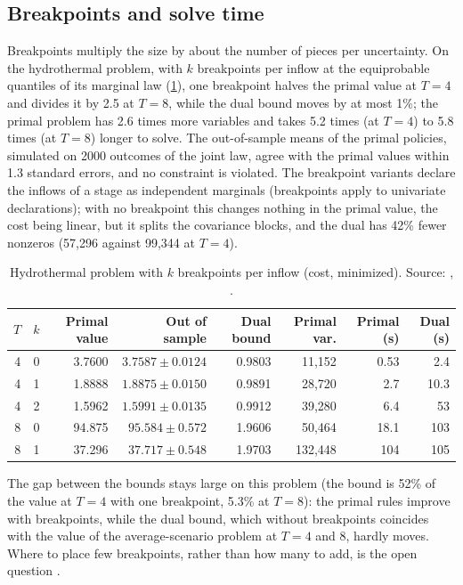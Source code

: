 \subsection{Breakpoints and solve time}

Breakpoints multiply the size by about the number of pieces per uncertainty.
On the hydrothermal problem, with $k$ breakpoints per inflow at the equiprobable quantiles of its marginal law (\cref{tab:breakpoints}),
one breakpoint halves the primal value at $T = 4$ and divides it by 2.5 at $T = 8$,
while the dual bound moves by at most 1\%;
the primal problem has 2.6 times more variables and takes 5.2 times (at $T = 4$) to 5.8 times (at $T = 8$) longer to solve.
The out-of-sample means of the primal policies, simulated on 2000 outcomes of the joint law, agree with the primal values within 1.3 standard errors, and no constraint is violated.
The breakpoint variants declare the inflows of a stage as independent marginals (breakpoints apply to univariate declarations);
with no breakpoint this changes nothing in the primal value, the cost being linear, but it splits the covariance blocks, and the dual has 42\% fewer nonzeros (57,296 against 99,344 at $T = 4$).

\begin{table}[ht]
\centering
\caption[Hydrothermal problem with breakpoints]{Hydrothermal problem with $k$ breakpoints per inflow (cost, minimized).
Source: , .}
\label{tab:breakpoints}
\small
\setlength{\tabcolsep}{4pt}
\begin{tabular}{rrrrrrrr}
\toprule
$T$ & $k$ & Primal value & Out of sample & Dual bound & Primal var. & Primal (s) & Dual (s) \\
\midrule
4 & 0 & 3.7600 & $3.7587 \pm 0.0124$ & 0.9803 & 11,152 & 0.53 & 2.4 \\
4 & 1 & 1.8888 & $1.8875 \pm 0.0150$ & 0.9891 & 28,720 & 2.7 & 10.3 \\
4 & 2 & 1.5962 & $1.5991 \pm 0.0135$ & 0.9912 & 39,280 & 6.4 & 53 \\
8 & 0 & 94.875 & $95.584 \pm 0.572$ & 1.9606 & 50,464 & 18.1 & 103 \\
8 & 1 & 37.296 & $37.717 \pm 0.548$ & 1.9703 & 132,448 & 104 & 105 \\
\bottomrule
\end{tabular}
\end{table}

The gap between the bounds stays large on this problem (the bound is 52\% of the value at $T = 4$ with one breakpoint, 5.3\% at $T = 8$):
the primal rules improve with breakpoints, while the dual bound, which without breakpoints coincides with the value of the average-scenario problem at $T = 4$ and $8$, hardly moves.
Where to place few breakpoints, rather than how many to add, is the open question \citep[end of Section~4.1]{GWK2015}.

